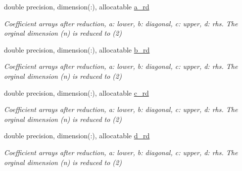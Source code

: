 \begin{DoxyCompactItemize}
\item 
double precision, dimension(\+:), allocatable \mbox{\hyperlink{structmodule__stdma_1_1stdma__plan__single_a74a506a97cfe769297cc3f6fdfbc6039}{a\+\_\+rd}}
\begin{DoxyCompactList}\small\item\em Coefficient arrays after reduction, a\+: lower, b\+: diagonal, c\+: upper, d\+: rhs. The orginal dimension (n) is reduced to (2) \end{DoxyCompactList}\item 
double precision, dimension(\+:), allocatable \mbox{\hyperlink{structmodule__stdma_1_1stdma__plan__single_a9123de8148ad2adbe2bb3a5f6defe63e}{b\+\_\+rd}}
\begin{DoxyCompactList}\small\item\em Coefficient arrays after reduction, a\+: lower, b\+: diagonal, c\+: upper, d\+: rhs. The orginal dimension (n) is reduced to (2) \end{DoxyCompactList}\item 
double precision, dimension(\+:), allocatable \mbox{\hyperlink{structmodule__stdma_1_1stdma__plan__single_a20b32358843fe3ca4e4490297dea3893}{c\+\_\+rd}}
\begin{DoxyCompactList}\small\item\em Coefficient arrays after reduction, a\+: lower, b\+: diagonal, c\+: upper, d\+: rhs. The orginal dimension (n) is reduced to (2) \end{DoxyCompactList}\item 
double precision, dimension(\+:), allocatable \mbox{\hyperlink{structmodule__stdma_1_1stdma__plan__single_a1a0f0eece00716c771d14880f2d120fa}{d\+\_\+rd}}
\begin{DoxyCompactList}\small\item\em Coefficient arrays after reduction, a\+: lower, b\+: diagonal, c\+: upper, d\+: rhs. The orginal dimension (n) is reduced to (2) \end{DoxyCompactList}\end{DoxyCompactItemize}

